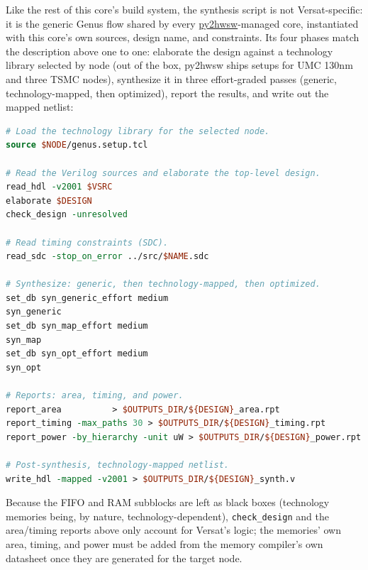 %

Like the rest of this core's build system, the synthesis script is not
Versat-specific: it is the generic Genus flow shared by every
\href{https://github.com/IObundle/py2hwsw}{py2hwsw}-managed core,
instantiated with this core's own sources, design name, and constraints.
Its four phases match the description above one to one: elaborate the
design against a technology library selected by node (out of the box,
py2hwsw ships setups for UMC 130nm and three TSMC nodes), synthesize it
in three effort-graded passes (generic, technology-mapped, then
optimized), report the results, and write out the mapped netlist:

\begin{lstlisting}[language=tcl,caption={py2hwsw's \texttt{hardware/syn/genus/build.tcl}: the Cadence Genus flow underlying this core's ASIC synthesis script (condensed).},label={lst:genus_flow}]
# Load the technology library for the selected node.
source $NODE/genus.setup.tcl

# Read the Verilog sources and elaborate the top-level design.
read_hdl -v2001 $VSRC
elaborate $DESIGN
check_design -unresolved

# Read timing constraints (SDC).
read_sdc -stop_on_error ../src/$NAME.sdc

# Synthesize: generic, then technology-mapped, then optimized.
set_db syn_generic_effort medium
syn_generic
set_db syn_map_effort medium
syn_map
set_db syn_opt_effort medium
syn_opt

# Reports: area, timing, and power.
report_area          > $OUTPUTS_DIR/${DESIGN}_area.rpt
report_timing -max_paths 30 > $OUTPUTS_DIR/${DESIGN}_timing.rpt
report_power -by_hierarchy -unit uW > $OUTPUTS_DIR/${DESIGN}_power.rpt

# Post-synthesis, technology-mapped netlist.
write_hdl -mapped -v2001 > $OUTPUTS_DIR/${DESIGN}_synth.v
\end{lstlisting}

Because the FIFO and RAM subblocks are left as black boxes (technology
memories being, by nature, technology-dependent), \texttt{check\_design}
and the area/timing reports above only account for Versat's logic; the
memories' own area, timing, and power must be added from the memory
compiler's own datasheet once they are generated for the target node.
